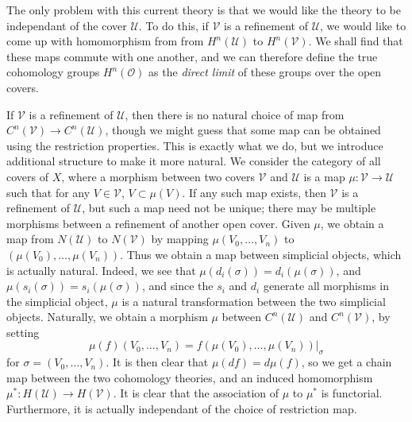 The only problem with this current theory is that we would like the theory to be independant of the cover $\mathcal{U}$. To do this, if $\mathcal{V}$ is a refinement of $\mathcal{U}$, we would like to come up with homomorphism from from $H^n(\mathcal{U})$ to $H^n(\mathcal{V})$. We shall find that these maps commute with one another, and we can therefore define the true cohomology groups $H^n(\mathcal{O})$ as the {\it direct limit} of these groups over the open covers.

If $\mathcal{V}$ is a refinement of $\mathcal{U}$, then there is no natural choice of map from $C^n(\mathcal{V}) \to C^n(\mathcal{U})$, though we might guess that some map can be obtained using the restriction properties. This is exactly what we do, but we introduce additional structure to make it more natural. We consider the category of all covers of $X$, where a morphism between two covers $\mathcal{V}$ and $\mathcal{U}$ is a map $\mu: \mathcal{V} \to \mathcal{U}$ such that for any $V \in \mathcal{V}$, $V \subset \mu(V)$. If any such map exists, then $\mathcal{V}$ is a refinement of $\mathcal{U}$, but such a map need not be unique; there may be multiple morphisms between a refinement of another open cover. Given $\mu$, we obtain a map from $N(\mathcal{U})$ to $N(\mathcal{V})$ by mapping $\mu(V_0, \dots, V_n)$ to $(\mu(V_0), \dots, \mu(V_n))$. Thus we obtain a map between simplicial objects, which is actually natural. Indeed, we see that $\mu(d_i(\sigma)) = d_i(\mu(\sigma))$, and $\mu(s_i(\sigma)) = s_i(\mu(\sigma))$, and since the $s_i$ and $d_i$ generate all morphisms in the simplicial object, $\mu$ is a natural transformation between the two simplicial objects. Naturally, we obtain a morphism $\mu$ between $C^n(\mathcal{U})$ and $C^n(\mathcal{V})$, by setting
%
\[ \mu(f)(V_0, \dots, V_n) = f(\mu(V_0), \dots, \mu(V_n))|_\sigma \]
%
for $\sigma = (V_0, \dots, V_n)$. It is then clear that $\mu(df) = d \mu(f)$, so we get a chain map between the two cohomology theories, and an induced homomorphism $\mu^*: H(\mathcal{U}) \to H(\mathcal{V})$. It is clear that the association of $\mu$ to $\mu^*$ is functorial. Furthermore, it is actually independant of the choice of restriction map.

